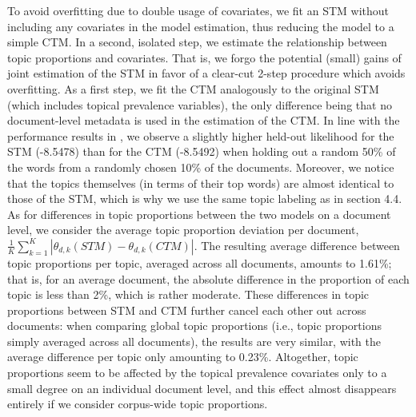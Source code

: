 \documentclass[12pt]{article}
\begin{document}
To avoid overfitting due to double usage of covariates, we fit an STM without including any covariates in the model estimation, thus reducing the model to a simple CTM. In a second, isolated step, we estimate the relationship between topic proportions and covariates. That is, we forgo the potential (small) gains of joint estimation of the STM in favor of a clear-cut 2-step procedure which avoids overfitting. As a first step, we fit the CTM analogously to the original STM (which includes topical prevalence variables), the only difference being that no document-level metadata is used in the estimation of the CTM. In line with the performance results in \cite{roberts2016model}, we observe a slightly higher held-out likelihood for the STM (-8.5478) than for the CTM (-8.5492) when holding out a random 50\% of the words from a randomly chosen 10\% of the documents. Moreover, we notice that the topics themselves (in terms of their top words) are almost identical to those of the STM, which is why we use the same topic labeling as in section 4.4. As for differences in topic proportions between the two models on a document level, we consider the average topic proportion deviation per document, $\frac{1}{K}\sum_{k=1}^{K}|\theta_{d,k}(STM)-\theta_{d,k}(CTM)|$. The resulting average difference between topic proportions per topic, averaged across all documents, amounts to 1.61\%; that is, for an average document, the absolute difference in the proportion of each topic is less than 2\%, which is rather moderate. These differences in topic proportions between STM and CTM further cancel each other out across documents: when comparing global topic proportions (i.e., topic proportions simply averaged across all documents), the results are very similar, with the average difference per topic only
amounting to 0.23\%. Altogether, topic proportions seem to be affected by the topical prevalence covariates only to a small degree on an individual document level, and this effect almost disappears entirely if we consider corpus-wide topic proportions.
\end{document}
